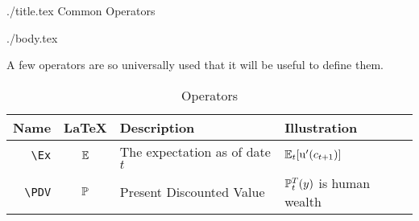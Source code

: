 \documentclass{econtex}
\begin{document}
\begin{verbatimwrite}{./title.tex}
Common Operators
\end{verbatimwrite}

\title{}

\date{\today}
\maketitle 

\begin{verbatimwrite}{./body.tex}

A few operators are so universally used that it will be useful to define them.

\begin{table}[h]
	\centering
	\begin{tabular}{||>{\ttfamily}rcll||} 		
		\hline
		 Name    & LaTeX         & Description & Illustration
  \\ \hline
     \verb|\Ex|        & $\operatorname{\mathbb{E}}$       & The expectation as of date $t$ & $\operatorname{\mathbb{E}}_{t}[{\mathrm{u}}^{\prime}(c_{t+1})]$
\\   \verb|\PDV|        & $\mathbb{P}$       & Present Discounted Value & $\mathbb{P}_{t}^{T}(y)$ is human wealth
  \\	\hline
	\end{tabular}
	\caption{Operators}
	\label{table:Operators}
\end{table}	



\end{verbatimwrite}

\end{document}
